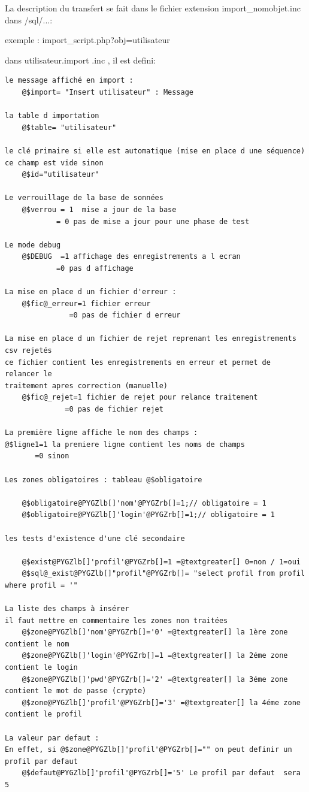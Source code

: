 \documentclass[letterpaper,10pt,french]{manual}
\begin{document}
La description du transfert se fait dans le fichier extension import\_nomobjet.inc dans /sql/...:

exemple : import\_script.php?obj=utilisateur

dans utilisateur.import .inc , il est defini:

\begin{Verbatim}[commandchars=@\[\]]
le message affiché en import :
    @$import= "Insert utilisateur" : Message

la table d importation
    @$table= "utilisateur"

le clé primaire si elle est automatique (mise en place d une séquence)
ce champ est vide sinon
    @$id="utilisateur"

Le verrouillage de la base de sonnées
    @$verrou = 1  mise a jour de la base
            = 0 pas de mise a jour pour une phase de test

Le mode debug
    @$DEBUG  =1 affichage des enregistrements a l ecran
            =0 pas d affichage

La mise en place d un fichier d'erreur :
    @$fic@_erreur=1 fichier erreur
               =0 pas de fichier d erreur

La mise en place d un fichier de rejet reprenant les enregistrements csv rejetés
ce fichier contient les enregistrements en erreur et permet de relancer le
traitement apres correction (manuelle)
    @$fic@_rejet=1 fichier de rejet pour relance traitement
              =0 pas de fichier rejet

La première ligne affiche le nom des champs :
@$ligne1=1 la premiere ligne contient les noms de champs
       =0 sinon

Les zones obligatoires : tableau @$obligatoire

    @$obligatoire@PYGZlb[]'nom'@PYGZrb[]=1;// obligatoire = 1
    @$obligatoire@PYGZlb[]'login'@PYGZrb[]=1;// obligatoire = 1

les tests d'existence d'une clé secondaire

    @$exist@PYGZlb[]'profil'@PYGZrb[]=1 =@textgreater[] 0=non / 1=oui
    @$sql@_exist@PYGZlb[]"profil"@PYGZrb[]= "select profil from profil where profil = '"

La liste des champs à insérer
il faut mettre en commentaire les zones non traitées
    @$zone@PYGZlb[]'nom'@PYGZrb[]='0' =@textgreater[] la 1ère zone contient le nom
    @$zone@PYGZlb[]'login'@PYGZrb[]=1 =@textgreater[] la 2éme zone contient le login
    @$zone@PYGZlb[]'pwd'@PYGZrb[]='2' =@textgreater[] la 3éme zone contient le mot de passe (crypte)
    @$zone@PYGZlb[]'profil'@PYGZrb[]='3' =@textgreater[] la 4éme zone contient le profil

La valeur par defaut :
En effet, si @$zone@PYGZlb[]'profil'@PYGZrb[]="" on peut definir un profil par defaut
    @$defaut@PYGZlb[]'profil'@PYGZrb[]='5' Le profil par defaut  sera 5
\end{Verbatim}
\end{document}
